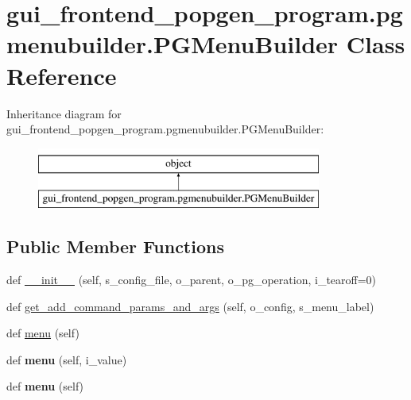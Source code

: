 \hypertarget{classgui__frontend__popgen__program_1_1pgmenubuilder_1_1PGMenuBuilder}{}\section{gui\+\_\+frontend\+\_\+popgen\+\_\+program.\+pgmenubuilder.\+P\+G\+Menu\+Builder Class Reference}
\label{classgui__frontend__popgen__program_1_1pgmenubuilder_1_1PGMenuBuilder}
Inheritance diagram for gui\+\_\+frontend\+\_\+popgen\+\_\+program.\+pgmenubuilder.\+P\+G\+Menu\+Builder\+:\begin{figure}[H]
\begin{center}
\leavevmode
\includegraphics[height=2.000000cm]{classgui__frontend__popgen__program_1_1pgmenubuilder_1_1PGMenuBuilder}
\end{center}
\end{figure}
\subsection*{Public Member Functions}
\begin{DoxyCompactItemize}
\item 
def \hyperlink{classgui__frontend__popgen__program_1_1pgmenubuilder_1_1PGMenuBuilder_a09e525c5459e1d60f7aaa31cc7b6e0ea}{\+\_\+\+\_\+init\+\_\+\+\_\+} (self, s\+\_\+config\+\_\+file, o\+\_\+parent, o\+\_\+pg\+\_\+operation, i\+\_\+tearoff=0)
\item 
def \hyperlink{classgui__frontend__popgen__program_1_1pgmenubuilder_1_1PGMenuBuilder_a717ed3e9feead39c81f11bf47a2d0cf4}{get\+\_\+add\+\_\+command\+\_\+params\+\_\+and\+\_\+args} (self, o\+\_\+config, s\+\_\+menu\+\_\+label)
\item 
def \hyperlink{classgui__frontend__popgen__program_1_1pgmenubuilder_1_1PGMenuBuilder_a74a9d002649b744dbc442a53a16dbc29}{menu} (self)
\item 
def {\bfseries menu} (self, i\+\_\+value)\hypertarget{classgui__frontend__popgen__program_1_1pgmenubuilder_1_1PGMenuBuilder_a02e8c4624d6ed366a5c8c942b8fcf609}{}\label{classgui__frontend__popgen__program_1_1pgmenubuilder_1_1PGMenuBuilder_a02e8c4624d6ed366a5c8c942b8fcf609}

\item 
def {\bfseries menu} (self)\hypertarget{classgui__frontend__popgen__program_1_1pgmenubuilder_1_1PGMenuBuilder_a74a9d002649b744dbc442a53a16dbc29}{}\label{classgui__frontend__popgen__program_1_1pgmenubuilder_1_1PGMenuBuilder_a74a9d002649b744dbc442a53a16dbc29}

\end{DoxyCompactItemize}
